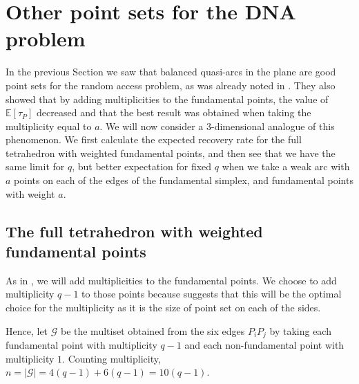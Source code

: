 \documentclass{article}
\newcommand{\Gscr}{\mathscr{G}}
\newcommand{\E}{\mathbb{E}}
\begin{document}
\section{Other point sets for the DNA problem}\label{sec:constructions}
In the previous Section we saw that balanced quasi-arcs in the plane are good point sets for the random access problem, as was already noted in \cite{GruicaMontanucciZullo2026}. They also showed that by adding multiplicities to the fundamental points, the value of $\E[\tau_P]$ decreased and that the best result was obtained when taking the multiplicity equal to $a$.
 We will now consider  a $3$-dimensional analogue of this phenomenon. We first calculate the expected recovery rate for the full tetrahedron with weighted fundamental points, and then see that we have the same limit for $q$, but better expectation for fixed $q$ when we take a weak arc with $a$ points on each of the edges of the fundamental simplex, and fundamental points with weight $a.$









\subsection{The full tetrahedron with weighted fundamental points}

As in \cite{GruicaMontanucciZullo2026}, we will add multiplicities to the fundamental points. We choose to add multiplicity $q-1$ to those points because \cite{BoruchovskyEtAl2026} suggests that this will be the optimal choice for the multiplicity as it is the size of point set on each of the sides.

Hence, let $\Gscr$ be the multiset obtained from the six edges $P_iP_j$  by taking each fundamental point with multiplicity $q-1$ and each
non-fundamental point with multiplicity $1$. Counting multiplicity, $
n=|\Gscr|=4(q-1)+6(q-1)=10(q-1).$ 
\end{document}
